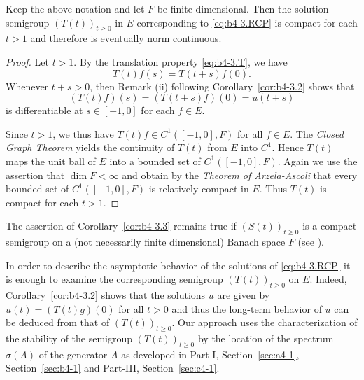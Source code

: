 \begin{corollary}\label{cor:b4-3.3}
	Keep the above notation and let $F$ be finite dimensional. 
    Then the solution semigroup $(T(t))_{t \geq 0}$ in $E$ corresponding to \eqref{eq:b4-3.RCP} is compact for each $t > 1$ and therefore is eventually norm continuous.
\end{corollary}
\begin{proof} 
Let $t > 1$. 
By the translation property \eqref{eq:b4-3.T}, we have 
\[%
T(t)f(s) = T(t+s)f(0) .
\] 
Whenever $t + s > 0$, then Remark (ii) following Corollary~\ref{cor:b4-3.2} shows that 
\[%
(T(t)f)(s) = (T(t+s)f)(0) = u(t+s)
\]
is differentiable 
at $s \in [-1,0]$ for each $f \in E$.

Since $t > 1$, we thus have $T(t)f \in C^1([-1,0],F)$ for all $f \in E$. 
The \emph{Closed Graph Theorem} yields the continuity of\/ $T(t)$ from $E$ into $C^1$. 
Hence $T(t)$ maps the unit ball of\/ $E$ into a bounded set of\/ $C^1([-1,0],F)$. 
Again we use the assertion that $\dim F < \infty$ and obtain by the \emph{Theorem of Arzela-Ascoli} that every bounded set of\/ $C^1([-1,0],F)$ is relatively compact in $E$. 
Thus $T(t)$ is compact for each $t > 1$.
\end{proof}
The assertion of Corollary~\ref{cor:b4-3.3} remains true if\/ $(S(t))_{t \geq 0}$ is a compact semigroup on a (not necessarily finite dimensional) Banach space $F$ (see \textcite{traviswebb:1974}).

In order to describe the asymptotic behavior of the solutions of \eqref{eq:b4-3.RCP} it is enough to examine the corresponding semigroup $(T(t))_{t \geq 0}$ on $E$. 
Indeed, Corollary~\ref{cor:b4-3.2} shows that the solutions $u$ are given by $u(t) = (T(t)g)(0)$ for all $t > 0$ and thus the long-term behavior of\/ $u$ can be deduced from that of\/ $(T(t))_{t \geq 0}$. 
Our approach uses the characterization of the stability of the semigroup $(T(t))_{t \geq 0}$ by the location of the spectrum $\sigma(A)$ of the generator $A$ as developed in Part-I, Section~\ref{sec:a4-1}, Section~\ref{sec:b4-1} and Part-III, Section~\ref{sec:c4-1}.

